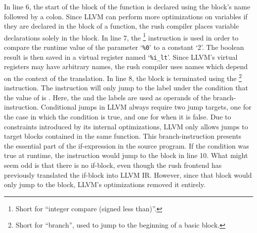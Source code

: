 In line 6, the start of the  block of the  function is declared using the block's name followed by a colon.
Since LLVM can perform more optimizations on variables if they are declared in the  block of a function,
the rush compiler places variable declarations solely in the  block.
In line 7, the \footnote{Short for \enquote{integer compare (signed less than)}.} instruction is used in order to compare the runtime value of the parameter `\texttt{\%0}' to a constant `{2}'.
The boolean result is then saved in a virtual register named `\texttt{\%i\_lt}'.
Since LLVM's virtual registers may have arbitrary names, the rush compiler uses names which depend on the context of the translation.
In line 8, the block is terminated using the \footnote{Short for \enquote{branch}, used to jump to the beginning of a basic block.} instruction.
The instruction will only jump to the  label under the condition that the value of  is .
Here, the  and the  labels are used as operands of the branch-instruction.
Conditional jumps in LLVM always require two jump targets, one for the case in which the condition is true, and one for when it is false.
Due to constraints introduced by its internal optimizations, LLVM only allows jumps to target blocks contained in the same function.
This branch-instruction presents the essential part of the if-expression in the source program.
If the condition was true at runtime, the instruction would jump to the  block in line 10.
What might seem odd is that there is no if-block, even though the rush frontend has previously translated the if-block into LLVM IR\@.
However, since that block would only jump to the  block, LLVM's optimizations removed it entirely.

